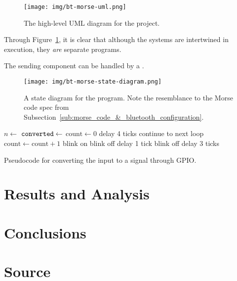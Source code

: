 \documentclass[11pt]{article}
\begin{document}
\begin{figure}[ht]
    \centering
    \texttt{[image: img/bt-morse-uml.png]}
    \caption{The high-level UML diagram for the project.}
    \label{fig:bt-morse-uml}
\end{figure}


Through Figure~\ref{fig:bt-morse-uml}, it is clear that although the systems are intertwined in execution, they \emph{are} separate programs.


The sending component can be handled by a .


\begin{figure}[ht]
    \centering
    \texttt{[image: img/bt-morse-state-diagram.png]}
    \caption{A state diagram for the program. Note the resemblance to the Morse code spec from Subsection~\ref{sub:morse_code_&_bluetooth_configuration}.}
    \label{fig:bt-morse-state-diagram}
\end{figure}


\begin{algorithm}[ht]
    \begin{algorithmic}[l]
        \State $n \gets$ 
        \State $\texttt{converted} \gets$ 
            \State $\text{count} \gets 0$
                \State delay 4 ticks
                \State continue to next loop
            \EndIf
                \State $\text{count} \gets \text{count} + 1$
            \EndWhile
                    \State blink on
                \Else
                    \State blink off
                \EndIf
                \State delay 1 tick
            \EndFor
            \State blink off
            \State delay 3 ticks
        \EndFor
        \EndProcedure
    \end{algorithmic}
    \caption{Pseudocode for converting the input to a signal through GPIO.}
    \label{alg:blink_signal_from_input}
\end{algorithm}


\section{Results and Analysis}
\label{sec:results_and_analysis}




\section{Conclusions}
\label{sec:conclusions}




\section{Source}
\label{sec:source}



\end{document}
